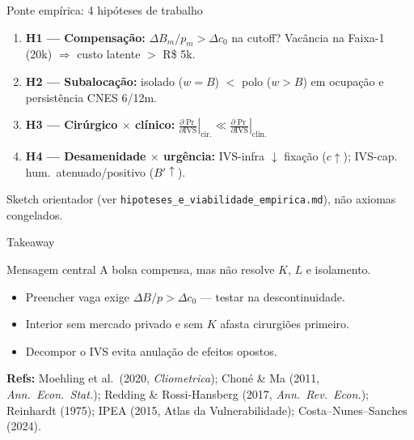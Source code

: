 \documentclass[10pt,aspectratio=169]{beamer}
\begin{document}
\begin{frame}{Ponte empírica: 4 hipóteses de trabalho}
\begin{enumerate}
  \item \textbf{H1 — Compensação:} $\Delta B_m / p_m > \Delta c_0$ na cutoff? Vacância na Faixa-1 (20k) $\Rightarrow$ custo latente $> $ R\$ 5k.
  \item \textbf{H2 — Subalocação:} isolado ($w = B$) $<$ polo ($w > B$) em ocupação e persistência CNES 6/12m.
  \item \textbf{H3 — Cirúrgico $\times$ clínico:} $\left.\frac{\partial \Pr}{\partial \text{IVS}}\right|_{\text{cir.}} \ll \left.\frac{\partial \Pr}{\partial \text{IVS}}\right|_{\text{clín.}}$
  \item \textbf{H4 — Desamenidade $\times$ urgência:} IVS-infra $\downarrow$ fixação ($c \uparrow$); IVS-cap.\,hum.\ atenuado/positivo ($B' \uparrow$).
\end{enumerate}
\vspace{0.3em}
{\small Sketch orientador (ver \texttt{hipoteses\_e\_viabilidade\_empirica.md}), não axiomas congelados.}
\end{frame}

\begin{frame}{Takeaway}
\begin{block}{Mensagem central}
A bolsa compensa, mas não resolve $K$, $L$ e isolamento.
\end{block}
\begin{itemize}
  \item Preencher vaga exige $\Delta B / p > \Delta c_0$ — testar na descontinuidade.
  \item Interior sem mercado privado e sem $K$ afasta cirurgiões primeiro.
  \item Decompor o IVS evita anulação de efeitos opostos.
\end{itemize}
\vspace{0.5em}
{\footnotesize
\textbf{Refs:} Moehling et al.\ (2020, \emph{Cliometrica}); Choné \& Ma (2011, \emph{Ann.\ Econ.\ Stat.});
Redding \& Rossi-Hansberg (2017, \emph{Ann.\ Rev.\ Econ.}); Reinhardt (1975);
IPEA (2015, Atlas da Vulnerabilidade); Costa--Nunes--Sanches (2024).
}
\end{frame}
\end{document}

